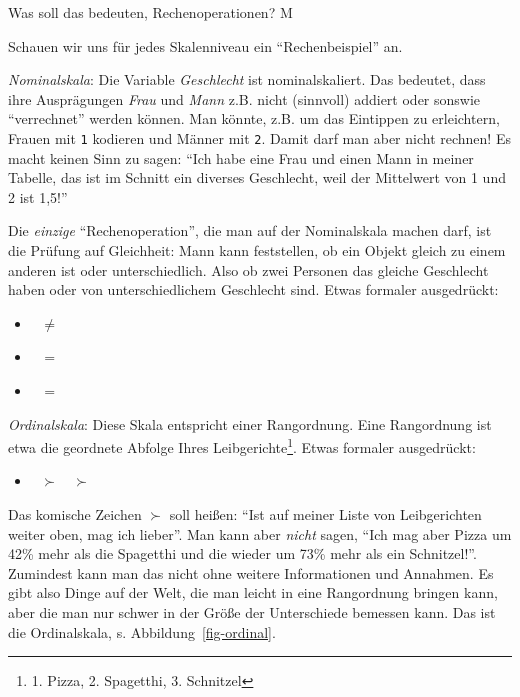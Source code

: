 \documentclass[
  a4paper,
  DIV=11]{scrreprt}
\providecommand{\tightlist}{%
  \setlength{\itemsep}{0pt}\setlength{\parskip}{0pt}}\usepackage{longtable,booktabs,array}
\theoremstyle{definition}
\theoremstyle{definition}
\theoremstyle{remark}
\begin{document}
Was soll das bedeuten, Rechenoperationen? M

Schauen wir uns für jedes Skalenniveau ein ``Rechenbeispiel'' an.

\emph{Nominalskala}: Die Variable \emph{Geschlecht} ist nominalskaliert.
Das bedeutet, dass ihre Ausprägungen \emph{Frau} und \emph{Mann} z.B.
nicht (sinnvoll) addiert oder sonswie ``verrechnet'' werden können. Man
könnte, z.B. um das Eintippen zu erleichtern, Frauen mit \texttt{1}
kodieren und Männer mit \texttt{2}. Damit darf man aber nicht rechnen!
Es macht keinen Sinn zu sagen: ``Ich habe eine Frau und einen Mann in
meiner Tabelle, das ist im Schnitt ein diverses Geschlecht, weil der
Mittelwert von 1 und 2 ist 1,5!''

Die \emph{einzige} ``Rechenoperation'', die man auf der Nominalskala
machen darf, ist die Prüfung auf Gleichheit: Mann kann feststellen, ob
ein Objekt gleich zu einem anderen ist oder unterschiedlich. Also ob
zwei Personen das gleiche Geschlecht haben oder von unterschiedlichem
Geschlecht sind. Etwas formaler ausgedrückt:

\begin{itemize}
\tightlist
\item
  👩 \(\ne\) 👨
\item
  👩 \(=\) 👩
\item
  👨 \(=\) 👨
\end{itemize}

\emph{Ordinalskala}: Diese Skala entspricht einer Rangordnung. Eine
Rangordnung ist etwa die geordnete Abfolge Ihres
Leibgerichte\footnote{1. Pizza, 2. Spagetthi, 3. Schnitzel}. Etwas
formaler ausgedrückt:

\begin{itemize}
\tightlist
\item
  🍕 \(\succ\) 🍝 \(\succ\) 🥩
\end{itemize}

Das komische Zeichen \(\succ\) soll heißen: ``Ist auf meiner Liste von
Leibgerichten weiter oben, mag ich lieber''. Man kann aber \emph{nicht}
sagen, ``Ich mag aber Pizza um 42\% mehr als die Spagetthi und die
wieder um 73\% mehr als ein Schnitzel!''. Zumindest kann man das nicht
ohne weitere Informationen und Annahmen. Es gibt also Dinge auf der
Welt, die man leicht in eine Rangordnung bringen kann, aber die man nur
schwer in der Größe der Unterschiede bemessen kann. Das ist die
Ordinalskala, s. Abbildung~\ref{fig-ordinal}.
\end{document}
